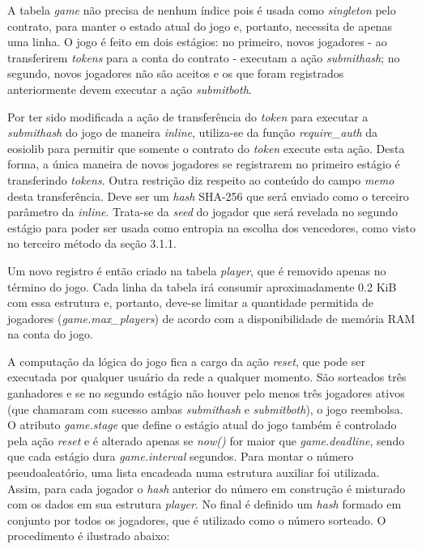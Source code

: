 \documentclass[a4paper,12pt]{monografia}
\theoremstyle{plain}
\theoremstyle{definition}
\theoremstyle{remark}
\begin{document}
A tabela \textit{game} n\~ao precisa de nenhum \'indice pois \'e usada como \textit{singleton} pelo contrato, para manter o estado atual do jogo e, portanto, necessita de apenas uma linha.
O jogo \'e feito em dois est\'agios: no primeiro, novos jogadores - ao transferirem \textit{tokens} para a conta do contrato - executam a a\c{c}\~ao \textit{submithash}; no segundo, novos jogadores n\~ao s\~ao aceitos e os que foram registrados anteriormente devem executar a a\c{c}\~ao \textit{submitboth}.

Por ter sido modificada a a\c{c}\~ao de transfer\^encia do \textit{token} para executar a \textit{submithash} do jogo de maneira \textit{inline}, utiliza-se da fun\c{c}\~ao \textit{require\_auth} da eosiolib para permitir que somente o contrato do \textit{token} execute esta a\c{c}\~ao.
Desta forma, a \'unica maneira de novos jogadores se registrarem no primeiro est\'agio \'e transferindo \textit{tokens}.
Outra restri\c{c}\~ao diz respeito ao conte\'udo do campo \textit{memo} desta transfer\^encia.
Deve ser um \textit{hash} SHA-256 que ser\'a enviado como o terceiro par\^ametro da \textit{inline}.
Trata-se da \textit{seed} do jogador que ser\'a revelada no segundo est\'agio para poder ser usada como entropia na escolha dos vencedores, como visto no terceiro m\'etodo da se\c{c}\~ao 3.1.1.

Um novo registro \'e ent\~ao criado na tabela \textit{player}, que \'e removido apenas no t\'ermino do jogo.
Cada linha da tabela ir\'a consumir aproximadamente 0.2 KiB com essa estrutura e, portanto, deve-se limitar a quantidade permitida de jogadores (\textit{game.max\_players}) de acordo com a disponibilidade de mem\'oria RAM na conta do jogo.

A computa\c{c}\~ao da l\'ogica do jogo fica a cargo da a\c{c}\~ao \textit{reset}, que pode ser executada por qualquer usu\'ario da rede a qualquer momento.
S\~ao sorteados tr\^es ganhadores e se no segundo est\'agio n\~ao houver pelo menos tr\^es jogadores ativos (que chamaram com sucesso ambas \textit{submithash} e \textit{submitboth}), o jogo reembolsa.
O atributo \textit{game.stage} que define o est\'agio atual do jogo tamb\'em \'e controlado pela a\c{c}\~ao \textit{reset} e \'e alterado apenas se \textit{now()} for maior que \textit{game.deadline}, sendo que cada est\'agio dura \textit{game.interval} segundos.
Para montar o n\'umero pseudoaleat\'orio, uma lista encadeada numa estrutura auxiliar foi utilizada.
Assim, para cada jogador o \textit{hash} anterior do n\'umero em constru\c{c}\~ao \'e misturado com os dados em sua estrutura \textit{player}.
No final \'e definido um \textit{hash} formado em conjunto por todos os jogadores, que \'e utilizado como o n\'umero sorteado.
O procedimento \'e ilustrado abaixo:
\end{document}
